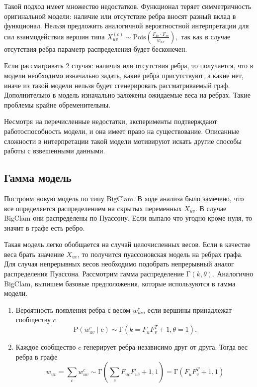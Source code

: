 \documentclass{ITaSconf}
\def\PP{\mathrm{P}}
\begin{document}
	Такой подход имеет множество недостатков.
	Функционал теряет симметричность оригинальной модели: наличие или отсутствие ребра вносят разный вклад в функционал. 
	Нельзя предложить аналогичной вероятностной интерпретации для сил взаимодействия вершин типа $ X_{uv}^{(c)} \sim \mathrm{Pois}\left(\frac{F_{uc} \cdot F_{vc}}{w_{uv}}\right),$
	так как в случае отсутствия ребра параметр распределения будет бесконечен.
	
	Если рассматривать 2 случая: наличия или отсутствия ребра, то получается, что в модели необходимо изначально задать, какие ребра присутствуют, а какие нет, иначе из такой модели нельзя будет сгенерировать рассматриваемый граф. 
	Дополнительно в модель изначально заложены ожидаемые веса на ребрах. 
	Такие проблемы крайне обременительны.
	
	Несмотря на перечисленные недостатки, эксперименты подтверждают работоспособность модели, и она имеет право на существование.
	Описанные сложности в интерпретации такой модели мотивируют искать другие способы работы с взвешенными данными.
	
	\subsection{Гамма модель}
	
	Построим новую модель по типу BigClam. 
	В ходе анализа было замечено, что все определяется распределением на скрытых переменных $X_{uv}$. 
	В случае BigClam они распределены по Пуассону. 
	Если выпало что угодно кроме нуля, то значит в графе есть ребро. 
	
	Такая модель легко обобщается на случай целочисленных весов. 
	Если в качестве веса брать значение $X_{uv}$, то получится пуассоновская модель на ребрах графа. 
	Для случая непрерывных весов необходимо подобрать непрерывный аналог распределения Пуассона.
	Рассмотрим гамма распределение $\mathrm{\Gamma}(k, \theta)$.
	Аналогично BigClam, выпишем базовые предположения, которые используются в гамма модели.
	
	\begin{enumerate}
		\item Вероятность появления ребра с весом $w^{c}_{uv}$, если вершины принадлежат сообществу $c$
		$$\PP\left(w^{c}_{uv} \mid c\right) \sim \mathrm{\Gamma}\left(k=F_u F_v^T + 1, \theta=1\right).$$
		\item Каждое сообщество $c$ генерирует ребра независимо друг от друга. Тогда вес ребра в графе
		$$w_{uv} = \sum_{c} w_{uv}^c \sim \mathrm{\Gamma}\left(\sum_c F_{uc} F_{vc} + 1, 1\right) = \mathrm{\Gamma}\left(F_u F_v^T + 1, 1\right)$$
	\end{enumerate}
	
\end{document}

